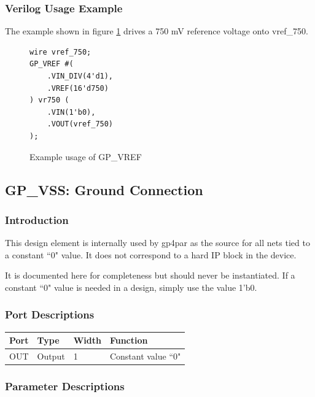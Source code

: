 \documentclass[11pt]{article}
\begin{document}
\pagebreak
\subsubsection{Verilog Usage Example}

The example shown in figure \ref{gp-vref-example} drives a 750 mV reference voltage onto vref\_750.

\begin{figure}[h]
\begin{lstlisting}
wire vref_750;
GP_VREF #(
	.VIN_DIV(4'd1),
	.VREF(16'd750)
) vr750 (
	.VIN(1'b0),
	.VOUT(vref_750)
);
\end{lstlisting}
\caption{Example usage of GP\_VREF}
\label{gp-vref-example}
\end{figure}


\clearpage
\pagebreak
\subsection{GP\_VSS: Ground Connection}

\subsubsection{Introduction}
This design element is internally used by gp4par as the source for all nets tied to a constant ``0" value. It does not 
correspond to a hard IP block in the device.

It is documented here for completeness but should never be instantiated. If a constant ``0" value is needed in a 
design, simply use the value 1'b0.

\subsubsection{Port Descriptions}

\begin{tabularx}{4in}{|l|l|l|X|}
\hline
{\bfseries Port} & {\bfseries Type} & {\bfseries Width} & {\bfseries Function} \\
\hline
OUT & Output & 1 & Constant value ``0" \\
\hline
\end{tabularx}

\subsubsection{Parameter Descriptions}
\end{document}
